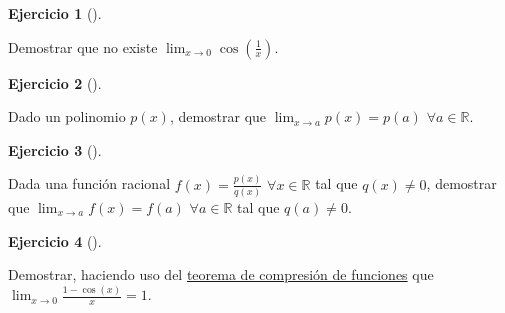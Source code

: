 \documentclass[
  a4paper,
]{scrreport}
\theoremstyle{definition}
\newtheorem{exercise}{Ejercicio}[chapter]
\theoremstyle{remark}
\begin{document}
\leavevmode{}%
\begin{exercise}[]\label{exr-limite-coseno}

Demostrar que no existe \(\lim_{x\to 0}\cos\left(\frac{1}{x}\right)\).

\end{exercise}

\leavevmode{}%
\begin{exercise}[]\label{exr-limite-polinomios}

Dado un polinomio \(p(x)\), demostrar que \(\lim_{x\to a}p(x)=p(a)\)
\(\forall a\in\mathbb{R}\).

\end{exercise}

\leavevmode{}%
\begin{exercise}[]\label{exr-limite-funciones-racionales}

Dada una función racional \(f(x)=\frac{p(x)}{q(x)}\)
\(\forall x\in\mathbb{R}\) tal que \(q(x)\neq 0\), demostrar que
\(\lim_{x\to a}f(x)=f(a)\) \(\forall a\in\mathbb{R}\) tal que
\(q(a)\neq 0\).

\end{exercise}

\leavevmode{}%
\begin{exercise}[]\label{exr-limit-emparedado}

Demostrar, haciendo uso del
\href{https://aprendeconalf.es/analisis-manual/limites.html\#thm-compresión-funciones}{teorema
de compresión de funciones} que
\(\lim_{x\to 0}\frac{1-\cos(x)}{x} = 1\).

\end{exercise}
\end{document}

